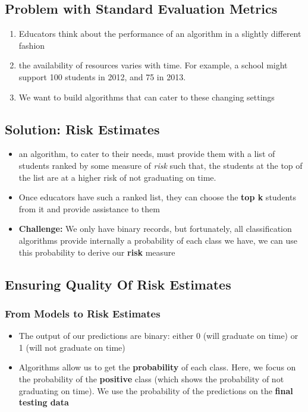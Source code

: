 \documentclass[11pt]{article}
\begin{document}
\subsection{Problem with Standard Evaluation Metrics}
\begin{enumerate}
\item Educators think about the performance of an algorithm in a slightly different fashion
\item the availability of resources varies with time. For example, a school might support 100 students in 2012, and 75 in 2013.
\item We want to build algorithms that can cater to these changing settings
\end{enumerate}

\subsection{Solution: Risk Estimates}
\begin{itemize}
\item an algorithm, to cater to their needs, must provide them with a list of students ranked by some measure of \textit{risk} such that, the students at the top of the list are at a higher risk of not graduating on time.

\item Once educators have such a ranked list, they can choose the \textbf{top k} students from it and provide assistance to them

\item \textbf{Challenge:} We only have binary records, but fortunately, all classification algorithms provide internally a probability of each class we have, we can use this probability to derive our \textbf{risk} measure
\end{itemize}

\subsection{Ensuring Quality Of Risk
Estimates}
\subsubsection{From Models to Risk Estimates}
\begin{itemize}
\item The output of our predictions are binary: either 0 (will graduate on time) or 1 (will not graduate on time)
\item Algorithms allow us to get the  \textbf{probability} of each class. Here, we focus on the probability of the \textbf{positive} class (which shows the probability of not graduating on time). We use the probability of the predictions on the \textbf{final testing data }
\end{itemize}
\end{document}
